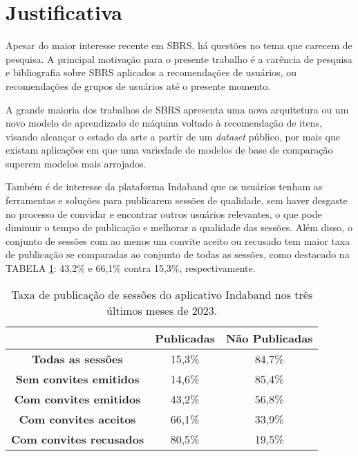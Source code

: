 \section{Justificativa}

Apesar do maior interesse recente em SBRS, há questões no tema que carecem de
 pesquisa. A principal motivação para o presente trabalho é a carência de
 pesquisa e bibliografia sobre SBRS aplicados a recomendações de usuários, ou
 recomendações de grupos de usuários até o presente momento.
 
 A grande maioria dos trabalhos de SBRS apresenta uma nova arquitetura ou um
 novo modelo de aprendizado de máquina voltado à recomendação de itens, visando
 alcançar o estado da arte a partir de um \textit{dataset} público, por mais que
 existam aplicações em que uma variedade de modelos de base de comparação
 superem modelos mais arrojados.
 
 Também é de interesse da plataforma Indaband que os usuários tenham as
 ferramentas e soluções para publicarem sessões de qualidade, sem haver desgaste
 no processo de convidar e encontrar outros usuários relevantes, o que pode
 diminuir o tempo de publicação e melhorar a qualidade das sessões. Além disso,
 o conjunto de sessões com ao menos um convite aceito ou recusado tem maior taxa
 de publicação se comparadas ao conjunto de todas as sessões, como destacado na
 TABELA \ref{tab:publicacao_sessoes}: 43,2\% e 66,1\% contra 15,3\%, respectivamente.
\begin{table}[htbp]
    \centering
    \begin{tabular}{|c|c|c|}
        \hline
        & \textbf{Publicadas} & \textbf{Não Publicadas} \\
        \hline
        \textbf{Todas as sessões} & 15,3\% & 84,7\% \\ 
        \hline
        \textbf{Sem convites emitidos} & 14,6\% & 85,4\% \\
        \hline
        \textbf{Com convites emitidos} & 43,2\% & 56,8\% \\ 
        \hline
        \textbf{Com convites aceitos} & 66,1\% & 33,9\% \\
        \hline
        \textbf{Com convites recusados} & 80,5\% & 19,5\% \\
        \hline
    \end{tabular}
    \caption{Taxa de publicação de sessões do aplicativo Indaband nos três últimos meses de 2023.}
    \label{tab:publicacao_sessoes}
\end{table}


